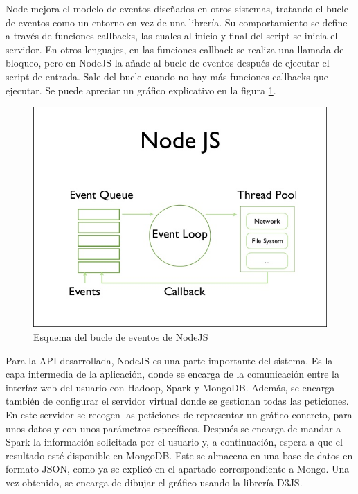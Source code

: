 Node mejora el modelo de eventos diseñados en otros sistemas, tratando el bucle de eventos como un entorno en vez de una librería. Su comportamiento se define a través de funciones callbacks, las cuales al inicio y final del script se inicia el servidor. En otros lenguajes, en las funciones callback se realiza una llamada de bloqueo, pero en NodeJS la añade al bucle de eventos después de ejecutar el script de entrada. Sale del bucle cuando no hay más funciones callbacks que ejecutar. Se puede apreciar un gráfico explicativo en la figura \ref{fig:nodejseventloop}.

\begin{figure}
	\centering
	\includegraphics[width=0.9\linewidth]{imagenes/NodeJS_Event_Loop}
	\caption{Esquema del bucle de eventos de NodeJS \cite{NodeJSEventLoop}}
	\label{fig:nodejseventloop}
\end{figure}

Para la API desarrollada, NodeJS es una parte importante del sistema. Es la capa intermedia de la aplicación, donde se encarga de la comunicación entre la interfaz web del usuario con Hadoop, Spark y MongoDB. 
Además, se encarga también de configurar el servidor virtual donde se gestionan todas las peticiones. En este servidor se recogen las peticiones de representar un gráfico concreto, para unos datos y con unos parámetros específicos. Después se encarga de mandar a Spark la información solicitada por el usuario y, a continuación, espera a que el resultado esté disponible en MongoDB. Este se almacena en una base de datos en formato JSON, como ya se explicó en el apartado correspondiente a Mongo. Una vez obtenido, se encarga de dibujar el gráfico usando la librería D3JS.

